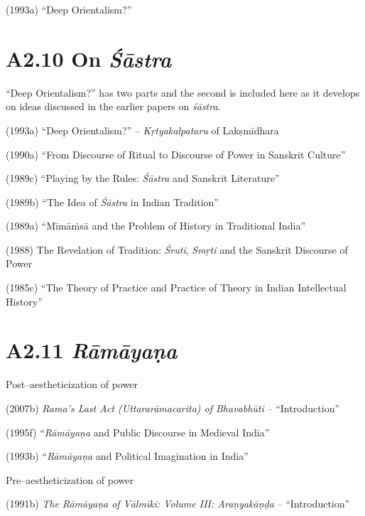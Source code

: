 (1993a) “Deep Orientalism?”

\newpage

\vspace{-.3cm}

\section*{A2.10 On {\it {\bfseries Śāstra}}}

“Deep Orientalism?” has two parts and the second is included here as it develops on ideas discussed in the earlier papers on \textit{śāstra}.

(1993a) “Deep Orientalism?” – \textit{Kṛtyakalpataru} of Lakṣmīdhara

(1990a) “From Discourse of Ritual to Discourse of Power in Sanskrit Culture”

(1989c) “Playing by the Rules: \textit{Śāstra} and Sanskrit Literature”

(1989b) “The Idea of \textit{Śāstra} in Indian Tradition”

(1989a) “Mīmāṁsā and the Problem of History in Traditional India”

(1988) The Revelation of Tradition: \textit{Śruti}, \textit{Smṛti} and the Sanskrit Discourse of Power 


(1985c) “The Theory of Practice and Practice of Theory in Indian Intellectual History”

\vspace{-.5cm}

\section*{A2.11 {\it {\bfseries Rāmāyaṇa}}}

Post–aestheticization of power

(2007b) \textit{Rama's Last Act (Uttararāmacarita) of Bhavabhūti} – “Introduction”

(1995f) “\textit{Rāmāyaṇa} and Public Discourse in Medieval India”

(1993b) “\textit{Rāmāyaṇa} and Political Imagination in India”

Pre–aestheticization of power

(1991b) \textit{The Rāmāyaṇa of Vālmīki: Volume III: Araṇyakāṇḍa} – “Introduction”

